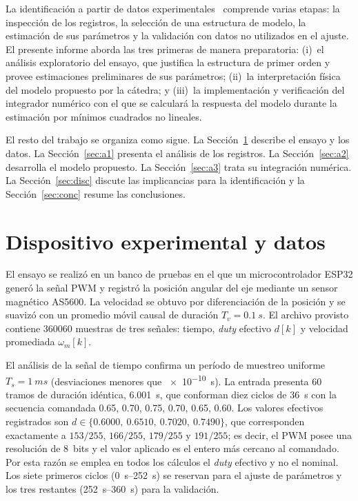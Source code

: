 \documentclass[journal,10pt,a4paper]{IEEEtran}
\begin{document}
La identificación a partir de datos experimentales~\cite{ljung} comprende varias etapas: la inspección de los registros, la selección de una estructura de modelo, la estimación de sus parámetros y la validación con datos no utilizados en el ajuste. El presente informe aborda las tres primeras de manera preparatoria: (i)~el análisis exploratorio del ensayo, que justifica la estructura de primer orden y provee estimaciones preliminares de sus parámetros; (ii)~la interpretación física del modelo propuesto por la cátedra; y (iii)~la implementación y verificación del integrador numérico con el que se calculará la respuesta del modelo durante la estimación por mínimos cuadrados no lineales.

El resto del trabajo se organiza como sigue. La Sección~\ref{sec:exp} describe el ensayo y los datos. La Sección~\ref{sec:a1} presenta el análisis de los registros. La Sección~\ref{sec:a2} desarrolla el modelo propuesto. La Sección~\ref{sec:a3} trata su integración numérica. La Sección~\ref{sec:disc} discute las implicancias para la identificación y la Sección~\ref{sec:conc} resume las conclusiones.

\section{Dispositivo experimental y datos}\label{sec:exp}
El ensayo se realizó en un banco de pruebas en el que un microcontrolador ESP32 generó la señal PWM y registró la posición angular del eje mediante un sensor magnético AS5600. La velocidad se obtuvo por diferenciación de la posición y se suavizó con un promedio móvil causal de duración $T_v=\SI{0.1}{s}$. El archivo provisto contiene \num{360060} muestras de tres señales: tiempo, \emph{duty} efectivo $d[k]$ y velocidad promediada $\omega_m[k]$.

El análisis de la señal de tiempo confirma un período de muestreo uniforme $T_s=\SI{1}{ms}$ (desviaciones menores que \SI{e-10}{s}). La entrada presenta 60 tramos de duración idéntica, \SI{6.001}{s}, que conforman diez ciclos de \SI{36}{s} con la secuencia comandada 0.65, 0.70, 0.75, 0.70, 0.65, 0.60. Los valores efectivos registrados son $d\in\{0.6000,\ 0.6510,\ 0.7020,\ 0.7490\}$, que corresponden exactamente a $153/255$, $166/255$, $179/255$ y $191/255$; es decir, el PWM posee una resolución de 8~bits y el valor aplicado es el entero más cercano al comandado. Por esta razón se emplea en todos los cálculos el \emph{duty} efectivo y no el nominal. Los siete primeros ciclos (\SIrange{0}{252}{s}) se reservan para el ajuste de parámetros y los tres restantes (\SIrange{252}{360}{s}) para la validación.
\end{document}

